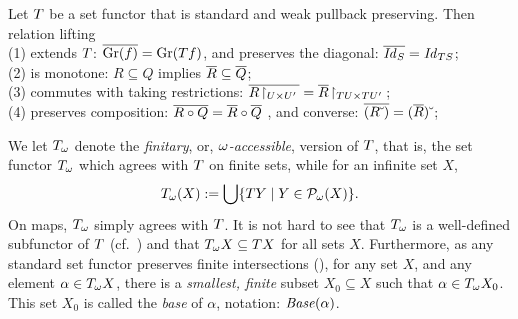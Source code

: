 \documentclass{book}
\begin{document}
\begin{fact}\label{fact:wpb}
Let $T$ be a set functor that is standard and weak pullback preserving. 
Then relation lifting 
\\ (1)  extends $T$: $\overline{\mathrm{Gr}(f)} = \mathrm{Gr}(T f)$,  and 
  preserves the diagonal: $\overline{\mathit{Id}_{S}} = \mathit{Id}_{T S}$; 
\\ (2) is monotone: $R \subseteq Q$ implies $\overline{R} \subseteq \overline{Q}$;
\\ (3) commutes with taking restrictions:
$\overline{R\!\upharpoonright_{U\times U'}\,} = \overline{R}\!\upharpoonright_{T U \times T U'}\,$;
\\ (4) preserves composition: $\overline{R \circ Q} = \overline{R} \circ \overline{Q}$ ,
  and converse: $\overline{(R\breve{\hspace*{1mm}})} = (\overline{R})\breve{\hspace*{1mm}}$;
\end{fact}
 
We let $T_{\omega}$ denote the \emph{finitary}, or,
\emph{$\omega$-accessible}, version of $T$, that is, the set
functor $T_{\omega}$ which agrees with $T$ on finite sets, while
for an infinite set $X$,
\[
T_{\omega}(X) := \bigcup \{ T Y \mid Y \in \mathcal{P}_{\omega}(X) \}.
\]
On maps, $T_{\omega}$ simply agrees with $T$.  It is not hard to
see that $T_{\omega}$ is a well-defined subfunctor of $T$
(cf.~\cite[p.314]{adam-trnk:automata}) and that $T_{\omega} X \subseteq
T X$ for all sets $X$.  Furthermore, as any standard set functor
preserves finite intersections (\cite[III,
Prop.~4.6]{adam-trnk:automata}), for any set $X$, and any element
$\alpha \in T_{\omega} X$, there is a \emph{smallest, finite} subset
$X_{0} \subseteq X$ such that $\alpha \in T_{\omega} X_{0}$.  This set
$X_{0}$ is called the \emph{base} of $\alpha$, notation:
$\mathit{Base}(\alpha)$.
\end{document}
